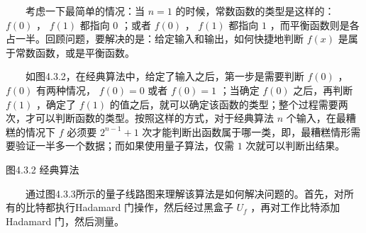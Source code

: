 \documentclass[a4paper,11pt,english]{sphinxmanual}
\begin{document}
\sphinxAtStartPar
  考虑一下最简单的情况：当 \(n=1\) 的时候，常数函数的类型是这样的： \(f(0)\) ， \(f(1)\) 都指向 \(0\) ；或者 \(f(0)\) ， \(f(1)\) 都指向 \(1\) ，而平衡函数则是各占一半。回顾问题，要解决的是：给定输入和输出，如何快捷地判断 \(f(x)\) 是属于常数函数，或是平衡函数。

\sphinxAtStartPar
  如图4.3.2，在经典算法中，给定了输入之后，第一步是需要判断 \(f(0)\) ， \(f(0)\) 有两种情况， \(f(0) = 0\) 或者 \(f(0) = 1\) ；当确定  \(f(0)\) 之后，再判断 \(f(1)\) ，确定了 \(f(1)\) 的值之后，就可以确定该函数的类型；整个过程需要两次，才可以判断函数的类型。按照这样的方式，对于经典算法 \(n\) 个输入，在最糟糕的情况下 \(f\) 必须要 \(2^{n-1}+1\) 次才能判断出函数属于哪一类，即，最糟糕情形需要验证一半多一个数据；而如果使用量子算法，仅需  \(1\) 次就可以判断出结果。


\begin{center}图4.3.2  经典算法
\end{center}
\sphinxAtStartPar
  通过图4.3.3所示的量子线路图来理解该算法是如何解决问题的。首先，对所有的比特都执行Hadamard 门操作，然后经过黑盒子 \(U_f\) ，再对工作比特添加 Hadamard 门，然后测量。

\end{document}
